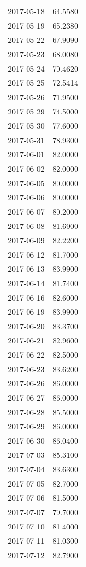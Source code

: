 \begin{tabular}{lr}
2017-05-18 &     64.5580 \\
2017-05-19 &     65.2380 \\
2017-05-22 &     67.9090 \\
2017-05-23 &     68.0080 \\
2017-05-24 &     70.4620 \\
2017-05-25 &     72.5414 \\
2017-05-26 &     71.9500 \\
2017-05-29 &     74.5000 \\
2017-05-30 &     77.6000 \\
2017-05-31 &     78.9300 \\
2017-06-01 &     82.0000 \\
2017-06-02 &     82.0000 \\
2017-06-05 &     80.0000 \\
2017-06-06 &     80.0000 \\
2017-06-07 &     80.2000 \\
2017-06-08 &     81.6900 \\
2017-06-09 &     82.2200 \\
2017-06-12 &     81.7000 \\
2017-06-13 &     83.9900 \\
2017-06-14 &     81.7400 \\
2017-06-16 &     82.6000 \\
2017-06-19 &     83.9900 \\
2017-06-20 &     83.3700 \\
2017-06-21 &     82.9600 \\
2017-06-22 &     82.5000 \\
2017-06-23 &     83.6200 \\
2017-06-26 &     86.0000 \\
2017-06-27 &     86.0000 \\
2017-06-28 &     85.5000 \\
2017-06-29 &     86.0000 \\
2017-06-30 &     86.0400 \\
2017-07-03 &     85.3100 \\
2017-07-04 &     83.6300 \\
2017-07-05 &     82.7000 \\
2017-07-06 &     81.5000 \\
2017-07-07 &     79.7000 \\
2017-07-10 &     81.4000 \\
2017-07-11 &     81.0300 \\
2017-07-12 &     82.7900 \\

\end{tabular}
